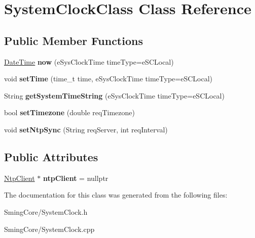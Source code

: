 \hypertarget{class_system_clock_class}{}\section{System\+Clock\+Class Class Reference}
\label{class_system_clock_class}
\subsection*{Public Member Functions}
\begin{DoxyCompactItemize}
\item 
\hypertarget{class_system_clock_class_afd37e409805ad1539a41078530111f8c}{}\hyperlink{class_date_time}{Date\+Time} {\bfseries now} (e\+Sys\+Clock\+Time time\+Type=e\+S\+C\+Local)\label{class_system_clock_class_afd37e409805ad1539a41078530111f8c}

\item 
\hypertarget{class_system_clock_class_af35d19f7fc85bcd762527d283c9cc6c5}{}void {\bfseries set\+Time} (time\+\_\+t time, e\+Sys\+Clock\+Time time\+Type=e\+S\+C\+Local)\label{class_system_clock_class_af35d19f7fc85bcd762527d283c9cc6c5}

\item 
\hypertarget{class_system_clock_class_a14d266686be92b56ea1896a3da4320ca}{}String {\bfseries get\+System\+Time\+String} (e\+Sys\+Clock\+Time time\+Type=e\+S\+C\+Local)\label{class_system_clock_class_a14d266686be92b56ea1896a3da4320ca}

\item 
\hypertarget{class_system_clock_class_a4bbd59de38bce5bf2d6585b5cfb81a27}{}bool {\bfseries set\+Timezone} (double req\+Timezone)\label{class_system_clock_class_a4bbd59de38bce5bf2d6585b5cfb81a27}

\item 
\hypertarget{class_system_clock_class_a0db5adecd4846623fbaad3c3fa1c21ff}{}void {\bfseries set\+Ntp\+Sync} (String req\+Server, int req\+Interval)\label{class_system_clock_class_a0db5adecd4846623fbaad3c3fa1c21ff}

\end{DoxyCompactItemize}
\subsection*{Public Attributes}
\begin{DoxyCompactItemize}
\item 
\hypertarget{class_system_clock_class_a8a6bf60237d8b83f2a068dbbc51acc53}{}\hyperlink{class_ntp_client}{Ntp\+Client} $\ast$ {\bfseries ntp\+Client} = nullptr\label{class_system_clock_class_a8a6bf60237d8b83f2a068dbbc51acc53}

\end{DoxyCompactItemize}


The documentation for this class was generated from the following files\+:\begin{DoxyCompactItemize}
\item 
Sming\+Core/System\+Clock.\+h\item 
Sming\+Core/System\+Clock.\+cpp\end{DoxyCompactItemize}
